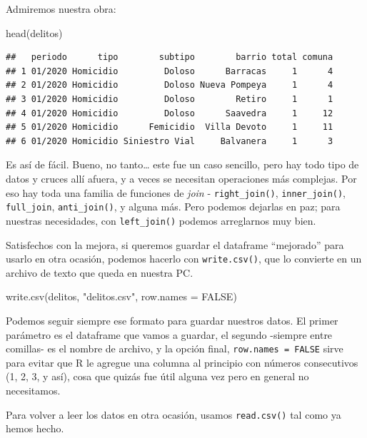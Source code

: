 \documentclass[
]{book}
\newenvironment{Shaded}{\begin{snugshade}}{\end{snugshade}}
\newcommand{\AttributeTok}[1]{\textcolor[rgb]{0.77,0.63,0.00}{#1}}
\newcommand{\ConstantTok}[1]{\textcolor[rgb]{0.00,0.00,0.00}{#1}}
\newcommand{\FunctionTok}[1]{\textcolor[rgb]{0.00,0.00,0.00}{#1}}
\newcommand{\NormalTok}[1]{#1}
\newcommand{\StringTok}[1]{\textcolor[rgb]{0.31,0.60,0.02}{#1}}
\begin{document}
Admiremos nuestra obra:

\begin{Shaded}
\begin{Highlighting}[]
\FunctionTok{head}\NormalTok{(delitos)}
\end{Highlighting}
\end{Shaded}

\begin{verbatim}
##   periodo      tipo        subtipo        barrio total comuna
## 1 01/2020 Homicidio         Doloso      Barracas     1      4
## 2 01/2020 Homicidio         Doloso Nueva Pompeya     1      4
## 3 01/2020 Homicidio         Doloso        Retiro     1      1
## 4 01/2020 Homicidio         Doloso      Saavedra     1     12
## 5 01/2020 Homicidio      Femicidio  Villa Devoto     1     11
## 6 01/2020 Homicidio Siniestro Vial     Balvanera     1      3
\end{verbatim}

Es así de fácil. Bueno, no tanto\ldots{} este fue un caso sencillo, pero hay todo tipo de datos y cruces allí afuera, y a veces se necesitan operaciones más complejas. Por eso hay toda una familia de funciones de \emph{join} - \texttt{right\_join()}, \texttt{inner\_join()}, \texttt{full\_join}, \texttt{anti\_join()}, y alguna más. Pero podemos dejarlas en paz; para nuestras necesidades, con \texttt{left\_join()} podemos arreglarnos muy bien.

Satisfechos con la mejora, si queremos guardar el dataframe ``mejorado'' para usarlo en otra ocasión, podemos hacerlo con \texttt{write.csv()}, que lo convierte en un archivo de texto que queda en nuestra PC.

\begin{Shaded}
\begin{Highlighting}[]
\FunctionTok{write.csv}\NormalTok{(delitos, }\StringTok{"delitos.csv"}\NormalTok{, }\AttributeTok{row.names =} \ConstantTok{FALSE}\NormalTok{)}
\end{Highlighting}
\end{Shaded}

Podemos seguir siempre ese formato para guardar nuestros datos. El primer parámetro es el dataframe que vamos a guardar, el segundo -siempre entre comillas- es el nombre de archivo, y la opción final, \texttt{row.names\ =\ FALSE} sirve para evitar que R le agregue una columna al principio con números consecutivos (1, 2, 3, y así), cosa que quizás fue útil alguna vez pero en general no necesitamos.

Para volver a leer los datos en otra ocasión, usamos \texttt{read.csv()} tal como ya hemos hecho.
\end{document}
